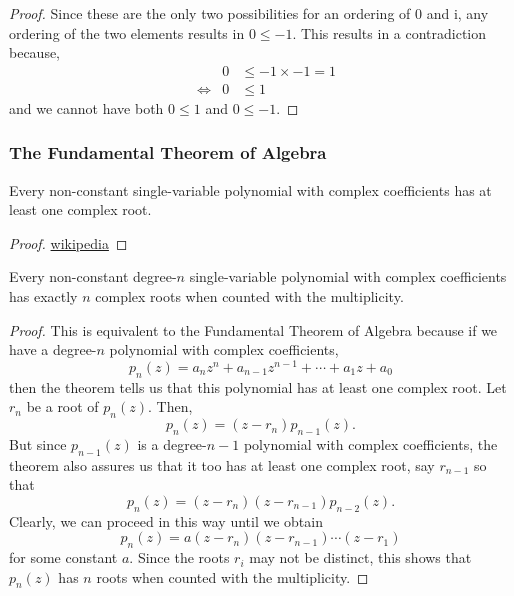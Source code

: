 \documentclass[../MathsNotesBase.tex]{subfiles}
\begin{document}
{\begin{proof}
			Since these are the only two possibilities for an ordering of 0 and i, any ordering of the two elements results in ${ 0 \leq -1 }$. This results in a contradiction because,
			\[\begin{aligned}
				&& 0 &\leq -1 \times -1 = 1  \\
				&\iff & 0 &\leq 1
			\end{aligned}\]
			and we cannot have both ${ 0 \leq 1 }$ and ${ 0 \leq -1 }$.
		\end{proof}
	
		\biggerskip
		\subsubsection{The Fundamental Theorem of Algebra}
		\begin{theorem}\label{theo:fundamental-theorem-of-algebra}
			Every non-constant single-variable polynomial with complex coefficients has at least one complex root.
		\end{theorem}
		\begin{proof}
			\href{https://en.wikipedia.org/wiki/Fundamental_theorem_of_algebra\#Proofs}{wikipedia}
		\end{proof}
		\begin{corollary}
			Every non-constant degree-$n$ single-variable polynomial with complex coefficients has exactly $n$ complex roots when counted with the multiplicity.
		\end{corollary}
		\begin{proof}
			This is equivalent to the Fundamental Theorem of Algebra because if we have a degree-$n$ polynomial with complex coefficients,
			\[ p_n(z) = a_n z^n + a_{n-1} z^{n-1} + \cdots + a_1 z + a_0 \]
			then the theorem tells us that this polynomial has at least one complex root. Let $r_n$ be a root of $p_n(z)$. Then,
			\[ p_n(z) = (z - r_n)p_{n-1}(z). \]
			But since $p_{n-1}(z)$ is a degree-$n-1$ polynomial with complex coefficients, the theorem also assures us that it too has at least one complex root, say $r_{n-1}$ so that
			\[ p_n(z) = (z - r_n)(z - r_{n-1})p_{n-2}(z). \]
			Clearly, we can proceed in this way until we obtain
			\[ p_n(z) = a(z - r_n)(z - r_{n-1})\cdots(z - r_1) \]
			for some constant $a$. Since the roots $r_i$ may not be distinct, this shows that $p_n(z)$ has $n$ roots when counted with the multiplicity.
		\end{proof}
	
		\biggerskip
}
\end{document}
